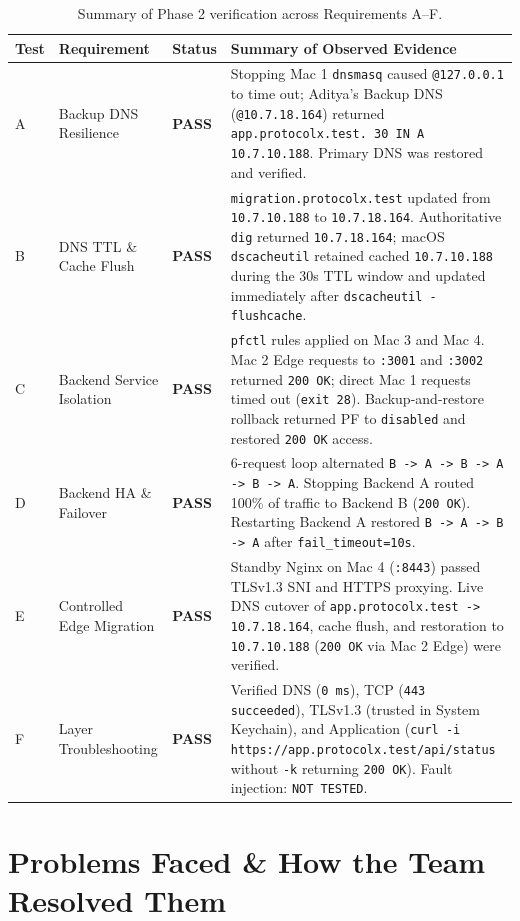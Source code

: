 \documentclass[11pt,a4paper]{article}
\begin{document}
\begin{table}[h!]
\centering
\small
\begin{tabular}{@{}lll p{7.5cm}@{}}
\toprule
\textbf{Test} & \textbf{Requirement} & \textbf{Status} & \textbf{Summary of Observed Evidence} \\
\midrule
A & Backup DNS Resilience & \textbf{PASS} & Stopping Mac 1 \texttt{dnsmasq} caused \texttt{@127.0.0.1} to time out; Aditya's Backup DNS (\texttt{@10.7.18.164}) returned \texttt{app.protocolx.test. 30 IN A 10.7.10.188}. Primary DNS was restored and verified. \\
B & DNS TTL \& Cache Flush & \textbf{PASS} & \texttt{migration.protocolx.test} updated from \texttt{10.7.10.188} to \texttt{10.7.18.164}. Authoritative \texttt{dig} returned \texttt{10.7.18.164}; macOS \texttt{dscacheutil} retained cached \texttt{10.7.10.188} during the 30s TTL window and updated immediately after \texttt{dscacheutil -flushcache}. \\
C & Backend Service Isolation & \textbf{PASS} & \texttt{pfctl} rules applied on Mac 3 and Mac 4. Mac 2 Edge requests to \texttt{:3001} and \texttt{:3002} returned \texttt{200 OK}; direct Mac 1 requests timed out (\texttt{exit 28}). Backup-and-restore rollback returned PF to \texttt{disabled} and restored \texttt{200 OK} access. \\
D & Backend HA \& Failover & \textbf{PASS} & 6-request loop alternated \texttt{B -> A -> B -> A -> B -> A}. Stopping Backend A routed 100\% of traffic to Backend B (\texttt{200 OK}). Restarting Backend A restored \texttt{B -> A -> B -> A} after \texttt{fail\_timeout=10s}. \\
E & Controlled Edge Migration & \textbf{PASS} & Standby Nginx on Mac 4 (\texttt{:8443}) passed TLSv1.3 SNI and HTTPS proxying. Live DNS cutover of \texttt{app.protocolx.test -> 10.7.18.164}, cache flush, and restoration to \texttt{10.7.10.188} (\texttt{200 OK} via Mac 2 Edge) were verified. \\
F & Layer Troubleshooting & \textbf{PASS} & Verified DNS (\texttt{0 ms}), TCP (\texttt{443 succeeded}), TLSv1.3 (trusted in System Keychain), and Application (\texttt{curl -i https://app.protocolx.test/api/status} without \texttt{-k} returning \texttt{200 OK}). Fault injection: \texttt{NOT TESTED}. \\
\bottomrule
\end{tabular}
\caption{Summary of Phase 2 verification across Requirements A--F.}
\end{table}

\section{Problems Faced \& How the Team Resolved Them}
\end{document}
